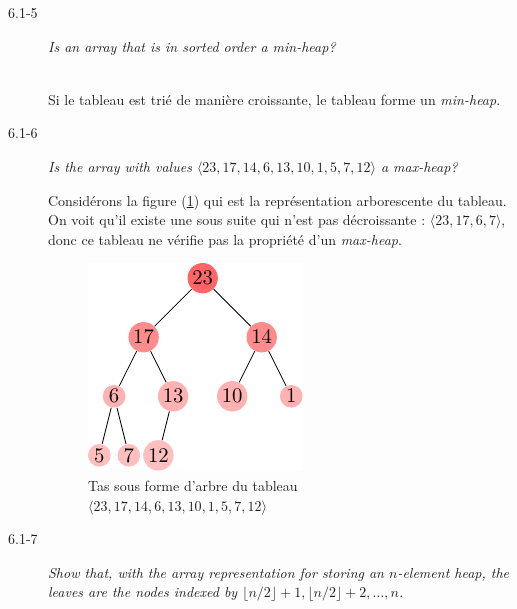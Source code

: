 \begin{description}
\begin{ex}
    \end{ex}
  \item[6.1-5] {\itshape Is an array that is in sorted order a min-heap?}
    \begin{ex}\mbox{}\\ %
      Si le tableau est tri\'e de mani\`ere croissante, le tableau forme un {\itshape min-heap}.
    \end{ex}
  \item[6.1-6] {\itshape Is the array with values $\langle 23, 17, 14, 6, 13, 10, 1, 5, 7, 12\rangle$ a max-heap?}
    \begin{ex}
      Consid\'erons la figure (\ref{fig:6.1-6}) qui est la repr\'esentation arborescente du tableau. On voit qu'il existe une sous suite qui n'est pas d\'ecroissante : $\langle 23, 17, 6, 7\rangle$, donc ce tableau ne v\'erifie pas la propri\'et\'e d'un \textit{max-heap}.
        \begin{figure}[H]
          \centering
        \includegraphics[scale=1.5]{img/6_1-6/6_1-6.pdf}
        \caption{Tas sous forme d'arbre du tableau $\langle 23, 17, 14, 6, 13, 10, 1, 5, 7, 12\rangle$}
          \label{fig:6.1-6}
        \end{figure}
    \end{ex}
  \item[6.1-7] {\itshape Show that, with the array representation for storing an $n$-element heap, the leaves are the nodes indexed by $\lfloor n/2 \rfloor +1, \lfloor n/2\rfloor + 2, \ldots, n$.}
    \begin{exrev}
      
    \end{exrev}
\end{description}
